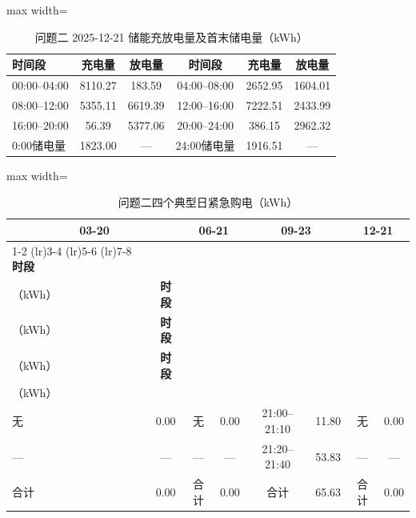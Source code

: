 \documentclass[UTF8,a4paper,zihao=-4,fontset=windows]{ctexart}
\begin{document}
\begin{table}[H]\centering
\fontsize{9.5}{12}\selectfont\setlength{\tabcolsep}{4pt}\renewcommand{\arraystretch}{1.12}
\begin{adjustbox}{max width=\linewidth}\begin{tabular}{lccccc}\toprule
\textbf{时间段} & \textbf{充电量} & \textbf{放电量} & \textbf{时间段} & \textbf{充电量} & \textbf{放电量}\\\midrule
00:00–04:00 & 8110.27 & 183.59 & 04:00–08:00 & 2652.95 & 1604.01\\
08:00–12:00 & 5355.11 & 6619.39 & 12:00–16:00 & 7222.51 & 2433.99\\
16:00–20:00 & 56.39 & 5377.06 & 20:00–24:00 & 386.15 & 2962.32\\
0:00储电量 & 1823.00 & — & 24:00储电量 & 1916.51 & —\\
\bottomrule\end{tabular}\end{adjustbox}
\caption{问题二 2025-12-21 储能充放电量及首末储电量（kWh）}
\end{table}
\begin{table}[H]\centering
\fontsize{9.5}{12}\selectfont\setlength{\tabcolsep}{4pt}\renewcommand{\arraystretch}{1.12}
\begin{adjustbox}{max width=\linewidth}\begin{tabular}{lccccccc}\toprule
\multicolumn{2}{c}{\textbf{03-20}} & \multicolumn{2}{c}{\textbf{06-21}} & \multicolumn{2}{c}{\textbf{09-23}} & \multicolumn{2}{c}{\textbf{12-21}}\\
\cmidrule(lr){1-2} \cmidrule(lr){3-4} \cmidrule(lr){5-6} \cmidrule(lr){7-8}
\textbf{时段} & \shortstack{\textbf{购电量}\\{\normalfont （kWh）}} & \textbf{时段} & \shortstack{\textbf{购电量}\\{\normalfont （kWh）}} & \textbf{时段} & \shortstack{\textbf{购电量}\\{\normalfont （kWh）}} & \textbf{时段} & \shortstack{\textbf{购电量}\\{\normalfont （kWh）}}\\\midrule
无 & 0.00 & 无 & 0.00 & 21:00–21:10 & 11.80 & 无 & 0.00\\
— & — & — & — & 21:20–21:40 & 53.83 & — & —\\
合计 & 0.00 & 合计 & 0.00 & 合计 & 65.63 & 合计 & 0.00\\
\bottomrule\end{tabular}\end{adjustbox}
\caption{问题二四个典型日紧急购电（kWh）}
\end{table}
\end{document}
